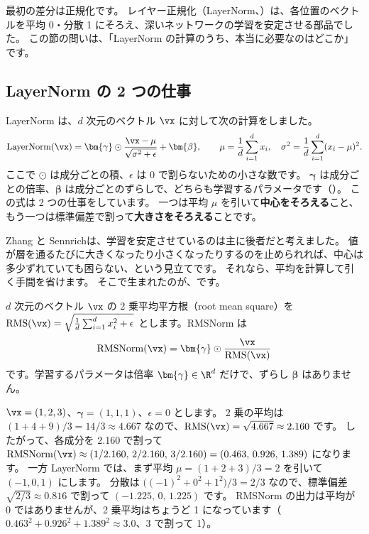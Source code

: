 最初の差分は正規化です。
レイヤー正規化（LayerNorm、）は、各位置のベクトルを平均 0・分散 1 にそろえ、深いネットワークの学習を安定させる部品でした。
この節の問いは、「LayerNorm の計算のうち、本当に必要なのはどこか」です。

\subsection*{LayerNorm の 2 つの仕事}

LayerNorm は、$d$ 次元のベクトル $\vx$ に対して次の計算をしました。
\begin{equation}
\mathrm{LayerNorm}(\vx)=\bm{\gamma}\odot\frac{\vx-\mu}{\sqrt{\sigma^2+\epsilon}}+\bm{\beta},\qquad
\mu=\frac1d\sum_{i=1}^d x_i,\quad \sigma^2=\frac1d\sum_{i=1}^d(x_i-\mu)^2 .
\label{eq:ma-layernorm}
\end{equation}
ここで $\odot$ は成分ごとの積、$\epsilon$ は 0 で割らないための小さな数です。
$\bm\gamma$ は成分ごとの倍率、$\bm\beta$ は成分ごとのずらしで、どちらも学習するパラメータです（）。
この式は 2 つの仕事をしています。
一つは平均 $\mu$ を引いて\textbf{中心をそろえる}こと、もう一つは標準偏差で割って\textbf{大きさをそろえる}ことです。

Zhang と Sennrich\cite{zhang2019root}は、学習を安定させているのは主に後者だと考えました。
値が層を通るたびに大きくなったり小さくなったりするのを止められれば、中心は多少ずれていても困らない、という見立てです。
それなら、平均を計算して引く手間を省けます。
そこで生まれたのが、です。

\begin{definition}[RMSNorm]
$d$ 次元のベクトル $\vx$ の 2 乗平均平方根（root mean square）を $\mathrm{RMS}(\vx)=\sqrt{\frac1d\sum_{i=1}^d x_i^2+\epsilon}$ とします。RMSNorm は
\begin{equation}
\mathrm{RMSNorm}(\vx)=\bm{\gamma}\odot\frac{\vx}{\mathrm{RMS}(\vx)}
\label{eq:ma-rmsnorm}
\end{equation}
です。学習するパラメータは倍率 $\bm{\gamma}\in\R^d$ だけで、ずらし $\bm{\beta}$ はありません。
\end{definition}

\begin{example}[3 次元の手計算]
$\vx=(1,2,3)$、$\bm{\gamma}=(1,1,1)$、$\epsilon=0$ とします。
2 乗の平均は $(1+4+9)/3=14/3\approx4.667$ なので、$\mathrm{RMS}(\vx)=\sqrt{4.667}\approx2.160$ です。
したがって、各成分を 2.160 で割って $\mathrm{RMSNorm}(\vx)\approx(1/2.160,\,2/2.160,\,3/2.160)=(0.463,\,0.926,\,1.389)$ になります。
一方 LayerNorm では、まず平均 $\mu=(1+2+3)/3=2$ を引いて $(-1,0,1)$ にします。
分散は $\bigl((-1)^2+0^2+1^2\bigr)/3=2/3$ なので、標準偏差 $\sqrt{2/3}\approx0.816$ で割って $(-1.225,\,0,\,1.225)$ です。
RMSNorm の出力は平均が 0 ではありませんが、2 乗平均はちょうど 1 になっています（$0.463^2+0.926^2+1.389^2\approx3.0$、3 で割って 1）。
\end{example}

